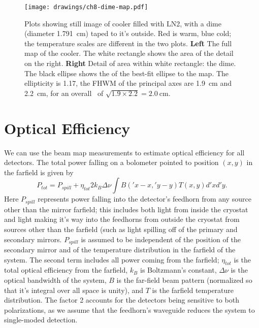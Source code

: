 \begin{figure}[th]
\centering
\texttt{[image: drawings/ch8-dime-map.pdf]}
\caption{
  Plots showing still image of cooler filled with LN2, with a dime (diameter \SI{1.791}{\cm}) taped to it's outside.
  Red is warm, blue cold; the temperature scales are different in the two plots.
  \textbf{Left} The full map of the cooler. The white rectangle shows the area of the detail on the right.
  \textbf{Right} Detail of area within white rectangle: the dime.
  The black ellipse shows the \FWHM of the best-fit ellipse to the map. The ellipticity is \num{1.17}, the FHWM of the principal axes are \SI{1.9}{\cm} and \SI{2.2}{\cm}, for an overall \FWHM\ of $\sqrt{1.9 \times 2.2} = \SI{2.0}{\cm}$.
}
\label{fig:ch8-dime-map}
\end{figure}

\section{Optical Efficiency} \label{sec:ch8-opt-eff}

We can use the beam map measurements to estimate optical efficiency for all detectors.
The total power falling on a bolometer pointed to position $(x,y)$ in the farfield is given by 
\begin{equation}
  P_{tot} = P_{spill} + \eta_{tot} 2 k_B \Delta \nu \int B(\prime{x} -x, \prime{y} - y) T(x,y) d\prime{x} d\prime{y}.
\end{equation}
Here $P_{spill}$ represents power falling into the detector's feedhorn from any source other than the mirror farfield; this includes both light from inside the cryostat and light making it's way into the feedhorns from outside the cryostat from sources other than the farfield (such as light spilling off of the primary and secondary mirrors.
$P_{spill}$ is assumed to be independent of the position of the secondary mirror and of the temperature distribution in the farfield of the system.
The second term includes all power coming from the farfield; $\eta_{tot}$ is the total optical efficiency from the farfield, $k_B$ is Boltzmann's constant, $\Delta \nu$ is the optical bandwidth of the system, $B$ is the far-field beam pattern (normalized so that it's integral over all space is unity), and $T$ is the farfield temperature distribution.
The factor 2 accounts for the detectors being sensitive to both polarizations, as we assume that the feedhorn's waveguide reduces the system to single-moded detection.

